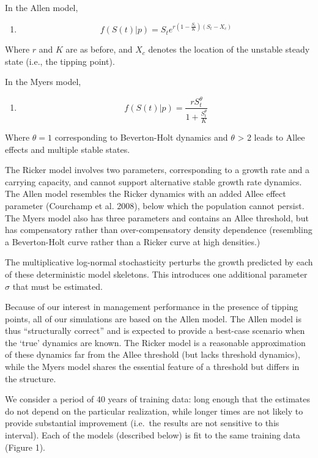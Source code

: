 \documentclass[]{components/elsarticle}
\begin{document}
In the Allen model,

\begin{enumerate}
\def\labelenumi{(\arabic{enumi})}
\setcounter{enumi}{1}
\itemsep1pt\parskip0pt
\item
  \[ f(S(t)|p) = S_t e^{r \left(1 - \frac{S_t}{K}\right)\left(S_t - X_c\right)} \]
\end{enumerate}

Where $r$ and $K$ are as before, and $X_c$ denotes the location of the
unstable steady state (i.e., the tipping point).

In the Myers model,

\begin{enumerate}
\def\labelenumi{(\arabic{enumi})}
\setcounter{enumi}{2}
\itemsep1pt\parskip0pt
\item
  \[ f(S(t) | p)  = \frac{r S_t^{\theta}}{1 + \frac{S_t^\theta}{K}}\]
\end{enumerate}

Where $\theta = 1$ corresponding to Beverton-Holt dynamics and $\theta$
\textgreater{} 2 leads to Allee effects and multiple stable states.

The Ricker model involves two parameters, corresponding to a growth rate
and a carrying capacity, and cannot support alternative stable growth
rate dynamics. The Allen model resembles the Ricker dynamics with an
added Allee effect parameter (Courchamp et al. 2008), below which the
population cannot persist. The Myers model also has three parameters and
contains an Allee threshold, but has compensatory rather than
over-compensatory density dependence (resembling a Beverton-Holt curve
rather than a Ricker curve at high densities.)

The multiplicative log-normal stochasticity perturbs the growth
predicted by each of these deterministic model skeletons. This
introduces one additional parameter $\sigma$ that must be estimated.

Because of our interest in management performance in the presence of
tipping points, all of our simulations are based on the Allen model. The
Allen model is thus ``structurally correct'' and is expected to provide
a best-case scenario when the `true' dynamics are known. The Ricker
model is a reasonable approximation of these dynamics far from the Allee
threshold (but lacks threshold dynamics), while the Myers model shares
the essential feature of a threshold but differs in the structure.

We consider a period of 40 years of training data: long enough that the
estimates do not depend on the particular realization, while longer
times are not likely to provide substantial improvement (i.e.~the
results are not sensitive to this interval). Each of the models
(described below) is fit to the same training data (Figure 1).
\end{document}
